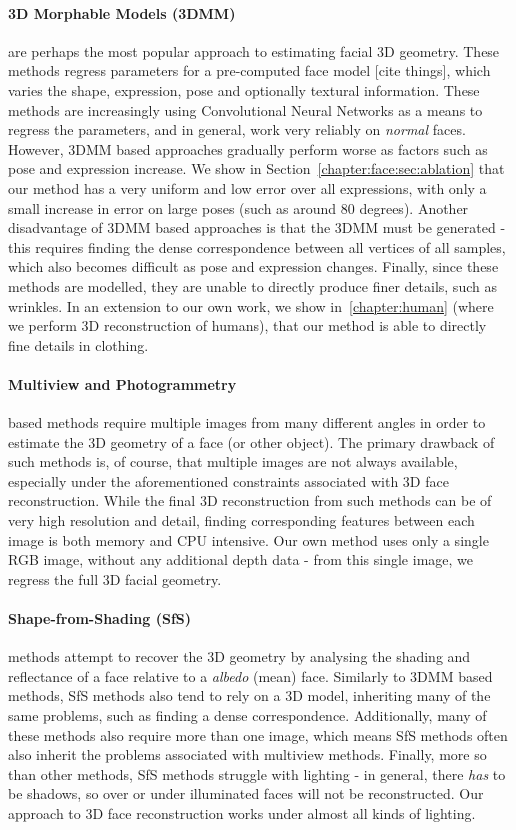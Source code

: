 \paragraph{3D Morphable Models (3DMM)} are perhaps the most popular
approach to estimating facial 3D geometry. These methods regress
parameters for a pre-computed face model [cite things], which varies
the shape, expression, pose and optionally textural information. These
methods are increasingly using Convolutional Neural Networks as a
means to regress the parameters, and in general, work very reliably on
\textit{normal} faces. However, 3DMM based approaches gradually
perform worse as factors such as pose and expression increase. We show
in Section~\ref{chapter:face:sec:ablation} that our method has a very
uniform and low error over all expressions, with only a small increase
in error on large poses (such as around 80 degrees). Another
disadvantage of 3DMM based approaches is that the 3DMM must be
generated - this requires finding the dense correspondence between all
vertices of all samples, which also becomes difficult as pose and
expression changes. Finally, since these methods are modelled, they
are unable to directly produce finer details, such as wrinkles. In an
extension to our own work, we show in~\ref{chapter:human} (where we
perform 3D reconstruction of humans), that our method is able to
directly fine details in clothing.


\paragraph{Multiview and Photogrammetry} based methods require
multiple images from many different angles in order to estimate the 3D
geometry of a face (or other object). The primary drawback of such
methods is, of course, that multiple images are not always available,
especially under the aforementioned constraints associated with 3D
face reconstruction. While the final 3D reconstruction from such
methods can be of very high resolution and detail, finding
corresponding features between each image is both memory and CPU
intensive. Our own method uses only a single RGB image, without any
additional depth data - from this single image, we regress the full 3D
facial geometry.

\paragraph{Shape-from-Shading (SfS)} methods attempt to recover the 3D
geometry by analysing the shading and reflectance of a face relative
to a \textit{albedo} (mean) face. Similarly to 3DMM based methods, SfS
methods also tend to rely on a 3D model, inheriting many of the same
problems, such as finding a dense correspondence. Additionally, many
of these methods also require more than one image, which means SfS
methods often also inherit the problems associated with multiview
methods. Finally, more so than other methods, SfS methods struggle
with lighting - in general, there \textit{has} to be shadows, so over
or under illuminated faces will not be reconstructed. Our approach to
3D face reconstruction works under almost all kinds of lighting.

